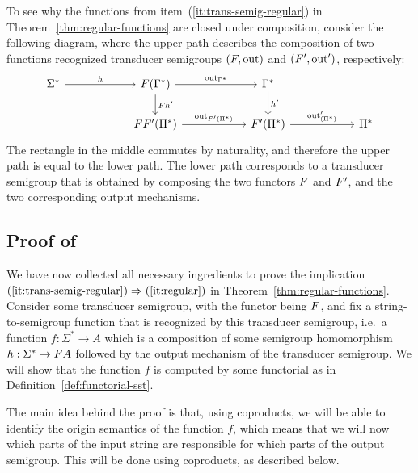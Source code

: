 To see why the functions from item~(\ref{it:trans-semig-regular}) in Theorem~\ref{thm:regular-functions} are closed under composition,  consider the following diagram, where the upper path describes the composition of two functions recognized transducer semigroups $(\functor,\outfun)$ and $(\functor',\outfun')$, respectively:
    \[
    \begin{tikzcd}
        [column sep=2cm]
        \Sigma^* 
        \ar[r,"h"]
        & 
        \functor(\Gamma^*)
        \ar[r,"\outfun_{\Gamma^*}"]
        \ar[d,"\functor h'"]
        &
        \Gamma^* \ar[d,"h'"]\\
        &
        \functor\functor'(\Pi^*) \ar[r,"\outfun_{\functor'(\Pi^*)}"]
        & 
        \functor'(\Pi^*)
        \ar[r,"\outfun'_{(\Pi^*)}"]
        &
        \Pi^*
    \end{tikzcd}
    \]
    The rectangle in the middle commutes by naturality, and therefore the upper path is equal to the lower path. The lower path corresponds to a transducer semigroup that is obtained by composing the two functors $\functor$ and $\functor'$, and the two corresponding output mechanisms.


 




\subsection{Proof of }

We have now collected all necessary ingredients to prove  the implication $(\ref{it:trans-semig-regular}) \Rightarrow (\ref{it:regular})$ in Theorem~\ref{thm:regular-functions}. Consider some transducer semigroup, with the functor being $\functor$, and fix a string-to-semigroup function that is recognized by this transducer semigroup, i.e.~a function $f : \Sigma^* \to A$ which is a composition  of some semigroup homomorphism $h : \Sigma^* \to \functor A$ followed by the output mechanism of the transducer semigroup.
We will show that the function $f$ is computed by some functorial \sst as in Definition~\ref{def:functorial-sst}.

The main idea behind the proof is that, using coproducts, we will be able to identify the origin semantics of the function $f$, which means that we will now which parts of the input string are responsible for which parts of the output semigroup. This will be done using coproducts, as described below.


